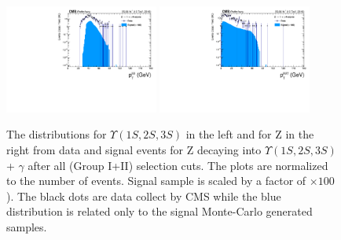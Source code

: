 \begin{figure}[!htbp]
\begin{center}
\includegraphics[width=0.45\textwidth]{figures_and_tables/outputPlots/ZtoUpsilon_Cat0_ZZZZZ/nEvts/data_x_mc/withKinCuts/h_withKin_Upsilon_Pt}\hspace*{1.cm}
\includegraphics[width=0.45\textwidth]{figures_and_tables/outputPlots/ZtoUpsilon_Cat0_ZZZZZ/nEvts/data_x_mc/withKinCuts/h_withKin_Z_Pt}
\end{center}\vspace*{-.5cm}
\caption{The \PT distributions for $\Upsilon(1S,2S,3S)$ in the left and for Z in the right from data and signal events for Z decaying into $\Upsilon(1S,2S,3S)$ + $\gamma$ after all (Group I+II) selection cuts. The plots are normalized to the number of events. Signal sample is scaled by a factor of $\times 100$). The black dots are data collect by CMS while the blue distribution is related only to the signal Monte-Carlo generated samples.}
\label{fig:pTUpsilon_and_Z_ZtoUpsilon_Cat0_groupI_plus_II}
\end{figure}


